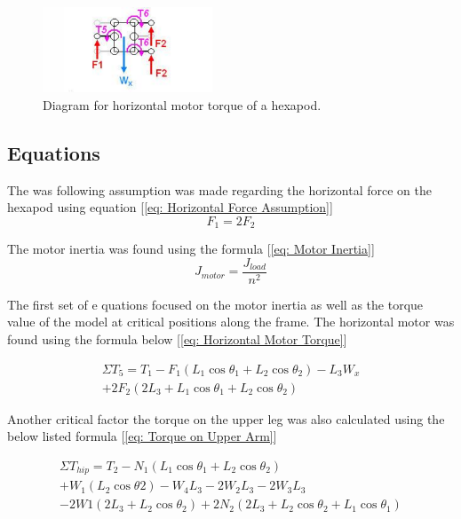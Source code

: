 \begin{figure}
 \centering
   \includegraphics[width = 0.45\textwidth]{figures/2.png}
\caption{Diagram for horizontal motor torque of a hexapod.}
    \label{fig:Diagram 2}
\end{figure}







\subsection{Equations}
The was following assumption was made regarding the horizontal force on the hexapod using equation [\ref{eq: Horizontal Force Assumption}]
\begin{equation} \label{eq: Horizontal Force Assumption}
	F_1 = 2F_2
\end{equation}


The motor inertia was found using the formula  [\ref{eq: Motor Inertia}]
\begin{equation} \label{eq: Motor Inertia}
	J_{motor} = \frac{J_{load}}{n^2}
\end{equation}

	The first set of e quations focused on the motor inertia as well as the torque value of the model at critical positions along the frame. 
The horizontal motor was found using the formula below  [\ref{eq: Horizontal Motor Torque}]


\begin{multline} \label{eq: Horizontal Motor Torque}
\Sigma T_5 = T_1 - F_1 (L_1 \cos \theta_1 + L_2 \cos \theta_2) - L_3 W_x\\ + 2F_2 (2L_3 + L_1 \cos \theta_1 + L_2 \cos \theta_2)
\end{multline}

Another critical factor the torque on the upper leg was also calculated using the below listed formula [\ref{eq: Torque on Upper Arm}]

\begin{multline} \label{eq: Torque on Upper Arm}
	\Sigma T_{hip} = T_2 - N_1 (L_1 \cos \theta_1 + L_2 \cos \theta_2)\\ +
	W_1 (L_2 \cos \theta2) -W_4 L_3 -2W_2 L_3 - 2W_3 L_3\\ - 2W1 (2L_3 + L_2 \cos \theta_2)  + 	2N_2 (2L_3 + L_2 \cos \theta_2 + L_1 \cos \theta_1 )
\end{multline} 

